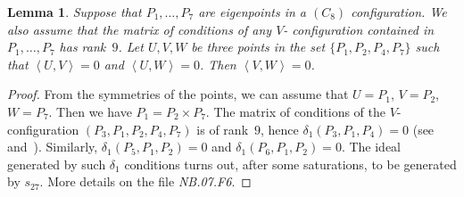 \documentclass[a4paper, 11pt, reqno]{amsart}
\theoremstyle{plain}
\newtheorem{lemma}{Lemma}[section]
\theoremstyle{definition}
\newcommand{\nb}[2]{\textsl{{NB}.{#1}.{#2}}}
\newcommand{\scl}[2]{\left\langle {#1}, {#2} \right\rangle}
\begin{document}
\begin{lemma}
\label{lemma:three_s_zero}
Suppose that $P_1, \dotsc, P_7$ are eigenpoints in a $(C_8)$ configuration.
We also assume that the matrix of conditions of any $V$- configuration contained in $P_1, \dotsc, P_7$ has rank~$9$.
Let $U, V, W$ be three points in the set $\{P_1, P_2, P_4, P_7\}$
such that $\scl{U}{V} = 0$ and $\scl{U}{W} = 0$.
Then $\scl{V}{W} = 0$.
\end{lemma}
\begin{proof}
From the symmetries of the points, we can assume that $U=P_1$, $V=P_2$, $W=P_7$.
Then we have $P_1 = P_2 \times P_7$.
The matrix of conditions of the $V$- configuration
$(P_3, P_1, P_2, P_4, P_7)$
is of rank~$9$, hence $\delta_1(P_3, P_1, P_4) = 0$
(see~ and~).
Similarly, $\delta_1(P_5, P_1, P_2) = 0$ and $\delta_1(P_6, P_1, P_2) = 0$.
The ideal generated by such
$\delta_1$ conditions turns out,
after some saturations, to be generated by $s_{27}$.
More details on the file \nb{07}{F6}.
\end{proof}
\end{document}
